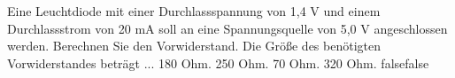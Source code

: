     {Eine Leuchtdiode mit einer Durchlassspannung von 1,4 V und einem Durchlassstrom von 20 mA soll an eine Spannungsquelle von 5,0 V angeschlossen werden. Berechnen Sie den Vorwiderstand. Die Größe des benötigten Vorwiderstandes beträgt ...}
    {180 Ohm.}
    {250 Ohm.}
    {70 Ohm.}
    {320 Ohm.}
    {false}{false}